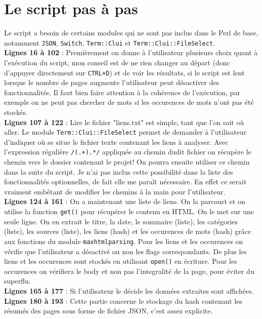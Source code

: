 \documentclass[11pt]{article}
\begin{document}
\section{Le script pas à pas}
Le script a besoin de certains modules qui ne sont pas inclus dans le Perl de base, notamment \texttt{JSON}, \texttt{Switch}, \texttt{Term::Clui} et \texttt{Term::Clui::FileSelect}. 
\bigskip
\\\textbf{Lignes 16 à 102} : Premièrement  on donne à l'utilisateur plusieurs choix quant à l'exécution du script, mon conseil est de ne rien changer au départ (donc d'appuyer directement sur \texttt{CTRL+D}) et de voir les résultats, si le script est lent lorsque le nombre de pages augmente l'utilisateur peut désactiver des fonctionnalités. Il faut bien faire attention à la cohérence de l'exécution, par exemple on ne peut pas chercher de mots si les occurences de mots n'ont pas été stockés.
\bigskip
\\\textbf{Lignes 107 à 122} : Lire le fichier "liens.txt" est simple, tant que l'on sait où aller. Le module \texttt{Term::Clui::FileSelect} permet de demander à l'utilisateur d'indiquer où se situe le fichier texte contenant les liens à analyser. Avec l'expression régulière \texttt{/(.+\/).*/} appliquée au chemin dudit fichier on récupère le chemin vers le dossier contenant le projet! On pourra ensuite utiliser ce chemin dans la suite du script. Je n'ai pas inclus cette possibilité dans la liste des fonctionnalités optionnelles, de fait elle me paraît nécessaire. En effet ce serait vraiment embêtant de modifier les chemins à la main pour l'utilisateur.
\bigskip
\\\textbf{Lignes 124 à 161} : On a maintenant une liste de liens. On la parcourt et on utilise la fonction \texttt{get()} pour récupérer le contenu en HTML. On le met sur une seule ligne. On en extrait le titre, la date, le sommaire (liste), les catégories (liste), les sources (liste), les liens (hash) et les occurences de mots (hash) grâce aux fonctions du module \texttt{maxhtmlparsing}. Pour les liens et les occurences on vérifie que l'utilisateur a désactivé ou non les flags correspondants. De plus les liens et les occurences sont stockés en utilisant \texttt{open()} en écriture. Pour les occurences on vérifiera le body et non pas l'integralité de la page, pour éviter du superflu.
\bigskip
\\\textbf{Lignes 165 à 177} : Si l'utilisateur le décide les données extraites sont affichées.
\bigskip
\\\textbf{Lignes 180 à 193} : Cette partie concerne le stockage du hash contenant les résumés des pages sous forme de fichier JSON, c'est assez explicite.
\end{document}
